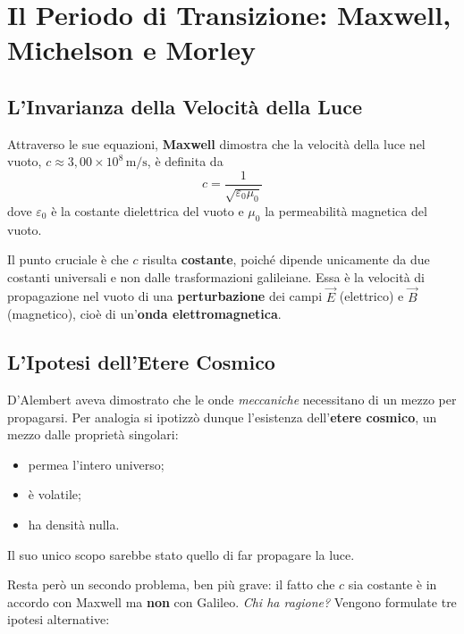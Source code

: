 \section{Il Periodo di Transizione: Maxwell, Michelson e Morley}

\subsection{L'Invarianza della Velocità della Luce}

Attraverso le sue equazioni, \textbf{Maxwell} dimostra che la velocità della luce nel vuoto, $c \approx 3{,}00 \times 10^8 \, \mathrm{m/s}$, è definita da
\begin{equation}
    c = \frac{1}{\sqrt{\varepsilon_0 \mu_0}}
\end{equation}
dove $\varepsilon_0$ è la costante dielettrica del vuoto e $\mu_0$ la permeabilità magnetica del vuoto.

Il punto cruciale è che $c$ risulta \textbf{costante}, poiché dipende unicamente da due costanti universali e non dalle trasformazioni galileiane. Essa è la velocità di propagazione nel vuoto di una \textbf{perturbazione} dei campi $\vec{E}$ (elettrico) e $\vec{B}$ (magnetico), cioè di un'\textbf{onda elettromagnetica}.

\subsection{L'Ipotesi dell'Etere Cosmico}

D'Alembert aveva dimostrato che le onde \emph{meccaniche} necessitano di un mezzo per propagarsi. Per analogia si ipotizzò dunque l'esistenza dell'\textbf{etere cosmico}, un mezzo dalle proprietà singolari:
\begin{itemize}
    \item permea l'intero universo;
    \item è volatile;
    \item ha densità nulla.
\end{itemize}
Il suo unico scopo sarebbe stato quello di far propagare la luce.

Resta però un secondo problema, ben più grave: il fatto che $c$ sia costante è in accordo con Maxwell ma \textbf{non} con Galileo. \emph{Chi ha ragione?} Vengono formulate tre ipotesi alternative:

